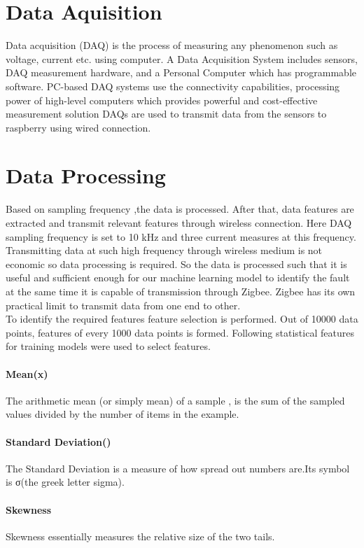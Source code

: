 \section{Data Aquisition}
Data acquisition (DAQ) is the process of measuring any phenomenon such as voltage, current etc. using computer. A Data Acquisition System includes sensors, DAQ measurement hardware, and a Personal Computer which has programmable software. PC-based DAQ systems use the connectivity capabilities, processing power of high-level computers which provides powerful and cost-effective measurement solution DAQs are used to transmit data from the sensors to raspberry using wired connection.\\
\section{Data Processing}
Based on sampling frequency ,the data is processed. After that, data features are extracted and transmit relevant features through wireless connection. Here DAQ sampling frequency is set to 10 kHz and three current measures at this frequency. Transmitting data at such high frequency through wireless medium is not economic so data processing is required. So the data is processed such that it is useful and sufficient enough for our machine learning model to identify the fault at the same time it is capable of transmission through Zigbee. Zigbee has its own practical limit to transmit data from one end to other.\\
To identify the required features feature selection is performed. Out of 10000 data points, features of every 1000 data points is formed. Following statistical features for training models were used to select features.\\
\paragraph{Mean(\overline x)}
The arithmetic mean (or simply mean) of a sample , is the sum of the sampled values divided by the number of items in the example.
\paragraph{Standard Deviation(\sigma)}
The Standard Deviation is a measure of how spread out numbers are.Its symbol is σ(the greek letter sigma).
\paragraph{Skewness}
Skewness essentially measures the relative size of the two tails.
